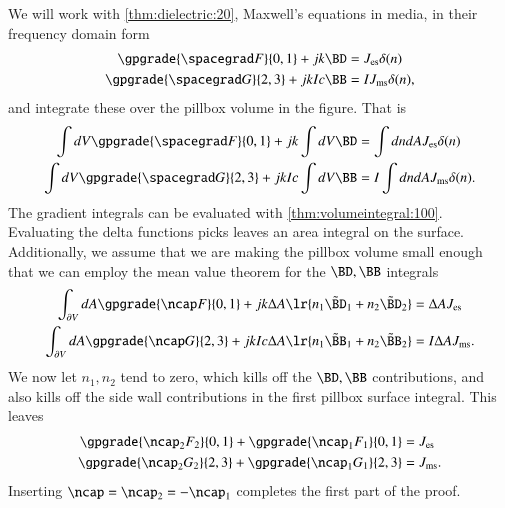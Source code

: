 We will work with \cref{thm:dielectric:20}, Maxwell's equations in media, in their frequency domain form
\begin{dmath}\label{eqn:boundarySurfaceSources:480}
\begin{aligned}
\gpgrade{ \spacegrad F }{0,1} + j k \BD &= J_{\textrm{es}} \delta(n) \\
\gpgrade{ \spacegrad G }{2,3} + j k I c \BB &= I J_{\textrm{ms}} \delta(n),
\end{aligned}
\end{dmath}
and integrate these over the pillbox volume in the figure.  That is
\begin{dmath}\label{eqn:boundarySurfaceSources:500}
\begin{aligned}
\int dV \gpgrade{ \spacegrad F }{0,1} + j k \int dV \BD &= \int dn dA J_{\textrm{es}} \delta(n) \\
\int dV \gpgrade{ \spacegrad G }{2,3} + j k I c \int dV \BB &= I \int dn dA J_{\textrm{ms}} \delta(n).
\end{aligned}
\end{dmath}
The gradient integrals can be evaluated with \cref{thm:volumeintegral:100}.  Evaluating the delta functions picks leaves an area integral on the surface.  Additionally, we assume that we are making the pillbox volume small enough that we can employ the mean value theorem for the \( \BD, \BB \) integrals
\begin{dmath}\label{eqn:boundarySurfaceSources:520}
\begin{aligned}
\int_{\partial V} dA \gpgrade{ \ncap F }{0,1} + j k \Delta A \lr{ n_1 \tilde{\BD}_1 + n_2 \tilde{\BD}_2 } &= \Delta A J_{\textrm{es}} \\
\int_{\partial V} dA \gpgrade{ \ncap G }{2,3} + j k I c \Delta A \lr{ n_1 \tilde{\BB}_1 + n_2 \tilde{\BB}_2} &= I \Delta A J_{\textrm{ms}}.
\end{aligned}
\end{dmath}
We now let \( n_1, n_2 \) tend to zero, which kills off the \( \BD, \BB \) contributions, and also kills off the side wall contributions in the first pillbox surface integral.  This leaves
\begin{dmath}\label{eqn:boundarySurfaceSources:540}
\begin{aligned}
\gpgrade{ \ncap_2 F_2 }{0,1} + \gpgrade{ \ncap_1 F_1 }{0,1} &= J_{\textrm{es}} \\
\gpgrade{ \ncap_2 G_2 }{2,3} + \gpgrade{ \ncap_1 G_1 }{2,3} &= J_{\textrm{ms}}.
\end{aligned}
\end{dmath}
Inserting \( \ncap = \ncap_2 = -\ncap_1 \) completes the first part of the proof.


